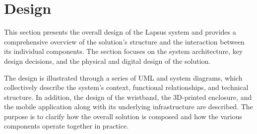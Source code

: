\section{Design}
This section presents the overall design of the Lapsus system and provides a comprehensive overview of the solution’s structure and the interaction between its individual components. The section focuses on the system architecture, key design decisions, and the physical and digital design of the solution.

The design is illustrated through a series of UML and system diagrams, which collectively describe the system’s context, functional relationships, and technical structure. In addition, the design of the wristband, the 3D-printed enclosure, and the mobile application along with its underlying infrastructure are described. The purpose is to clarify how the overall solution is composed and how the various components operate together in practice.







